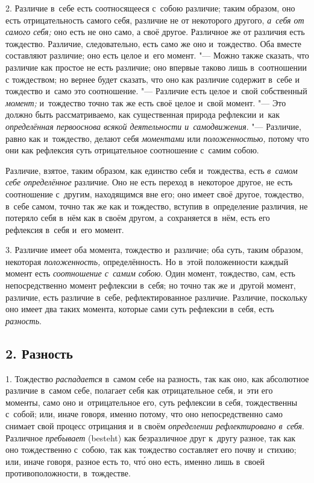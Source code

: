 2. Различие в~себе есть соотносящееся с~собою различие; таким образом, оно
есть отрицательность самого себя, различие не от некоторого другого,
{\em а~себя от самого себя;} оно есть не оно само, а
своё другое. Различное же от различия есть тождество. Различие,
следовательно, есть само же оно и~тождество. Оба вместе составляют
различие; оно есть целое и~его момент. "--- Можно также сказать, что различие
как простое не есть различие; оно впервые таково лишь в~соотношении с
тождеством; но вернее будет сказать, что оно как различие содержит в~себе и
тождество и~само это соотношение. "--- Различие есть целое и~свой собственный
{\em момент;} и~тождество точно так же есть своё целое
и~свой момент. "--- Это должно быть рассматриваемо, как существенная природа
рефлексии и~как {\em определённая первооснова всякой
деятельности и~самодвижения}. "--- Различие, равно как и~тождество, делают
себя {\em моментами} или
{\em положенностью,} потому что они как рефлексия суть
отрицательное соотношение с~самим собою.

Различие, взятое, таким образом, как единство себя и~тождества, есть
{\em в~самом себе определённое} различие. Оно не есть
переход в~некоторое другое, не есть соотношение с~другим, находящимся вне
его; оно имеет своё другое, тождество, в~себе самом, точно так же как и
тождество, вступив в~определение различия, не потеряло себя в~нём как в
своём другом, а~сохраняется в~нём, есть его рефлексия в~себя и~его момент.

3. Различие имеет оба момента, тождество и~различие; оба суть, таким
образом, некоторая {\em положенность,} определённость.
Но в~этой положенности каждый момент есть
{\em соотношение с~самим собою}. Один момент,
тождество, сам, есть непосредственно момент рефлексии в~себя; но точно так
же и~другой момент, различие, есть различие в~себе, рефлектированное
различие. Различие, поскольку оно имеет два таких момента, которые сами
суть рефлексии в~себя, есть {\em разность}.

\subsection[2. Разность]{2. Разность}
1. Тождество {\em распадается} в~самом себе на разность, так как
оно, как абсолютное различие в~самом себе, полагает себя как отрицательное
себя, и~эти его моменты, само оно и~отрицательное его, суть рефлексии в
себя, тождественны с~собой; или, иначе говоря, именно потому, что оно
непосредственно само снимает свой процесс отрицания и~в своём
{\em определении рефлектировано в~себя}. Различное
{\em пребывает} (besteht) как безразличное друг к~другу
разное, так как оно тождественно с~собою, так как тождество составляет его
почву и~стихию; или, иначе говоря, разное есть то, чт\'{о} оно есть, именно
лишь в~своей противоположности, в~тождестве.

